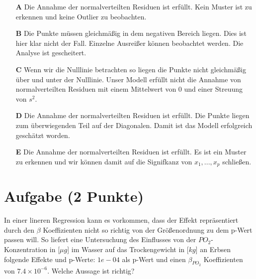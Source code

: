 \documentclass[a4paper, 9pt]{scrartcl}\usepackage[]{graphicx}\usepackage[]{xcolor}
\begin{document}
\begin{enumerate}
\item [\textbf{A} \msquare] Die Annahme der normalverteilten Residuen ist erfüllt. Kein Muster ist zu erkennen und keine Outlier zu beobachten.
\item [\textbf{B} \msquare] Die Punkte müssen gleichmäßig in dem negativen Bereich liegen. Dies ist hier klar nicht der Fall. Einzelne Ausreißer können beobachtet werden. Die Analyse ist gescheitert.
\item [\textbf{C} \msquare] Wenn wir die Nulllinie betrachten so liegen die Punkte nicht gleichmäßig über und unter der Nulllinie. Unser Modell erfüllt nicht die Annahme von normalverteilten Residuen mit einem Mittelwert von 0 und einer Streuung von $s^2$.
\item [\textbf{D} \msquare] Die Annahme der normalverteilten Residuen ist erfüllt. Die Punkte liegen zum überwiegenden Teil auf der Diagonalen. Damit ist das Modell erfolgreich geschätzt worden.
\item [\textbf{E} \msquare] Die Annahme der normalverteilten Residuen ist erfüllt. Es ist ein Muster zu erkennen und wir können damit auf die Signifkanz von $x_1, ..., x_p$ schließen.
\end{enumerate}

\section{Aufgabe \hfill (2 Punkte)}

\ifcollection
\begin{flushright}
\tiny\vspace{-2Ex}
\textbf{\examinhaltstart}
\exammodulebiostat
\vspace{-1Ex}
\end{flushright}
\fi




In einer lineren Regression kann es vorkommen, dass der Effekt repräsentiert durch den $\beta$ Koeffizienten nicht so richtig von der Größenordnung zu dem p-Wert passen will. So liefert eine Untersuchung des Einflusses von der $PO_2$-Konzentration in [$\mu g$] im Wasser auf das Trockengewicht in [$kg$] an Erbsen folgende Effekte und p-Werte: $1e-04$ als p-Wert und einen $\beta_{PO_2}$ Koeffizienten von $7.4\times 10^{-6}$. Welche Aussage ist richtig?
\end{document}
